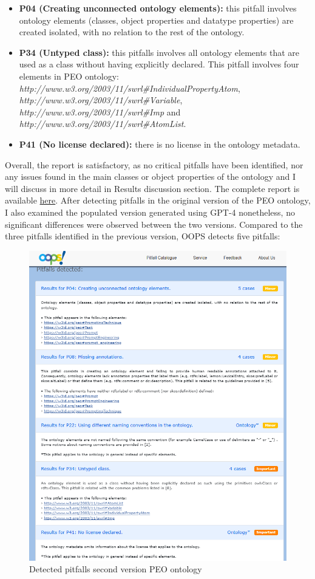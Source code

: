 \begin{itemize}
    \item \textbf{P04 (Creating unconnected ontology elements):} this pitfall involves ontology elements (classes, object properties and datatype properties) are created isolated, with no relation to the rest of the ontology. 

    \item \textbf{P34 (Untyped class):} this pitfalls involves all ontology elements that are used as a class without having explicitly declared. This pitfall involves four elements in PEO ontology: \\ \textit{http://www.w3.org/2003/11/swrl\#IndividualPropertyAtom},\\ \textit{http://www.w3.org/2003/11/swrl\#Variable},\\ \textit{http://www.w3.org/2003/11/swrl\#Imp} and \\\textit{http://www.w3.org/2003/11/swrl\#AtomList}.

    \item \textbf{P41 (No license declared):} there is no license in the ontology metadata.    
\end{itemize}
Overall, the report is satisfactory, as no critical pitfalls have been identified, nor any issues found in the main classes or object properties of the ontology and I will discuss in more detail in Results discussion section. The complete report is available \href{https://github.com/simonegramegna/peo/blob/main/evaluation/oops_report_peo.xml}{here}. After detecting pitfalls in the original version of the PEO ontology, I also examined the populated version generated using GPT-4 nonetheless, no significant differences were observed between the two versions. Compared to the three pitfalls identified in the previous version, OOPS detects five pitfalls:
\begin{figure}[H]
    \centering
    \includegraphics[width=0.75\linewidth]{Figures/fig_44.png}
    \caption{Detected pitfalls second version PEO ontology}
    \label{fig:enter-label}
\end{figure}


